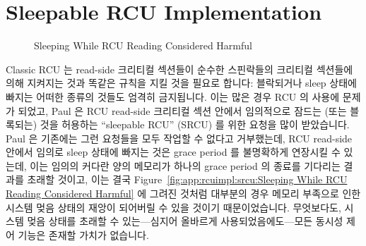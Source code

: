 
\section{Sleepable RCU Implementation}
\label{app:rcuimpl:Sleepable RCU Implementation}

\begin{figure}[tb]
\centering
{}
\caption{Sleeping While RCU Reading Considered Harmful}
\end{figure}

Classic RCU 는 read-side 크리티컬 섹션들이 순수한 스핀락들의 크리티컬 섹션들에
의해 지켜지는 것과 똑같은 규칙을 지킬 것을 필요로 합니다: 블락되거나 sleep
상태에 빠지는 어떠한 종류의 것들도 엄격히 금지됩니다.
이는 많은 경우 RCU 의 사용에 문제가 되었고, Paul 은 RCU read-side 크리티컬 섹션
안에서 임의적으로 잠드는 (또는 블록되는) 것을 허용하는 ``sleepable RCU'' (SRCU)
를 위한 요청을 많이 받았습니다.
Paul 은 기존에는 그런 요청들을 모두 작업할 수 없다고 거부했는데, RCU read-side
안에서 임의로 sleep 상태에 빠지는 것은 grace period 를 불명확하게 연장시킬 수
있는데, 이는 임의의 커다란 양의 메모리가 하나의 grace period 의 종료를 기다리는
결과를 초래할 것이고, 이는 결국
Figure~\ref{fig:app:rcuimpl:srcu:Sleeping While RCU Reading Considered Harmful}
에 그려진 것처럼 대부분의 경우 메모리 부족으로 인한 시스템 멎음 상태의 재앙이
되어버릴 수 있을 것이기 때문이었습니다.
무엇보다도, 시스템 멎음 상태를 초래할 수 있는---심지어 올바르게
사용되었음에도---모든 동시성 제어 기능은 존재할 가치가 없습니다.
\iffalse

